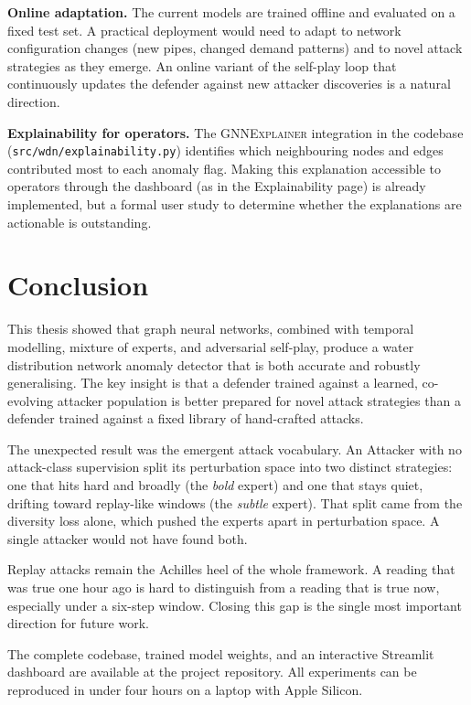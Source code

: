 \textbf{Online adaptation.} The current models are trained offline
and evaluated on a fixed test set. A practical deployment would
need to adapt to network configuration changes (new pipes, changed
demand patterns) and to novel attack strategies as they emerge. An
online variant of the self-play loop that continuously updates the
defender against new attacker discoveries is a natural direction.

\textbf{Explainability for operators.} The \textsc{GNNExplainer}
integration in the codebase (\texttt{src/wdn/explainability.py})
identifies which neighbouring nodes and edges contributed most to
each anomaly flag. Making this explanation accessible to operators
through the dashboard (as in the Explainability page) is already
implemented, but a formal user study to determine whether the
explanations are actionable is outstanding.

\section{Conclusion}
\label{sec:conclusion}

This thesis showed that graph neural networks, combined with temporal
modelling, mixture of experts, and adversarial self-play, produce a
water distribution network anomaly detector that is both accurate
and robustly generalising. The key insight is that a defender trained
against a learned, co-evolving attacker population is better prepared
for novel attack strategies than a defender trained against a fixed
library of hand-crafted attacks.

The unexpected result was the emergent attack vocabulary. An Attacker
\moe{} with no attack-class supervision split its perturbation space
into two distinct strategies: one that hits hard and broadly (the
\emph{bold} expert) and one that stays quiet, drifting toward
replay-like windows (the \emph{subtle} expert). That split came from
the diversity loss alone, which pushed the experts apart in perturbation
space. A single attacker would not have found both.

Replay attacks remain the Achilles heel of the whole framework.
A reading that was true one hour ago is hard to distinguish from a
reading that is true now, especially under a six-step window. Closing
this gap is the single most important direction for future work.

The complete codebase, trained model weights, and an interactive
Streamlit dashboard are available at the project repository. All
experiments can be reproduced in under four hours on a laptop with
Apple Silicon.
